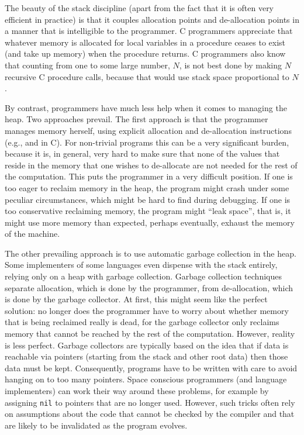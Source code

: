 \documentclass[12pt]{book}
\begin{document}
The beauty of the stack discipline 
(apart from the fact that it is often very efficient in
practice) is that it couples allocation points and de-allocation points in a manner
that is intelligible to the programmer. C programmers appreciate that whatever memory
is allocated for local variables in a procedure ceases to exist (and take up memory)
when the procedure returns. C programmers also know that counting from
one to some large number, $N$,  is not best done by making $N$ recursive
C procedure calls, because that would use stack space proportional to $N$.

By contrast, programmers have much less help when it comes to managing
the heap.  Two approaches prevail. The first approach is that the
programmer manages memory herself, using explicit allocation and
de-allocation instructions (e.g.,  and  in C). For non-trivial
programs this can be a very significant burden, because it is, in
general, very hard to make sure that none of the values that reside in
the memory that one wishes to de-allocate are not needed for the rest
of the computation.  This puts the programmer in a very difficult
position. If one is too eager to reclaim memory in the heap, the
program might crash under some peculiar circumstances, which might be
hard to find during debugging. If one is too conservative reclaiming
memory, the program might ``leak space'', that is, it might use more
memory than expected, perhaps eventually, exhaust the memory of the
machine.

The other prevailing approach is to use automatic garbage collection
in the heap.  Some implementers of some languages even dispense with
the stack entirely, relying only on a heap with garbage collection.
Garbage collection techniques separate allocation, which is done by
the programmer, from de-allocation, which is done by the garbage
collector.  At first, this might seem like the perfect solution: no
longer does the programmer have to worry about whether memory that is
being reclaimed really is dead, for the garbage collector only
reclaims memory that cannot be reached by the rest of the
computation. However, reality is less perfect. Garbage collectors are
typically based on the idea that if data is reachable via pointers
(starting from the stack and other root data) then those data must be
kept. Consequently, programs have to be written with care to avoid
hanging on to too many pointers. Space conscious programmers (and
language implementers) can work their way around these problems, for
example by assigning {\tt nil} to pointers that are no longer used.
However, such tricks often rely on assumptions about the code that
cannot be checked by the compiler and that are likely to be
invalidated as the program evolves.
\end{document}
